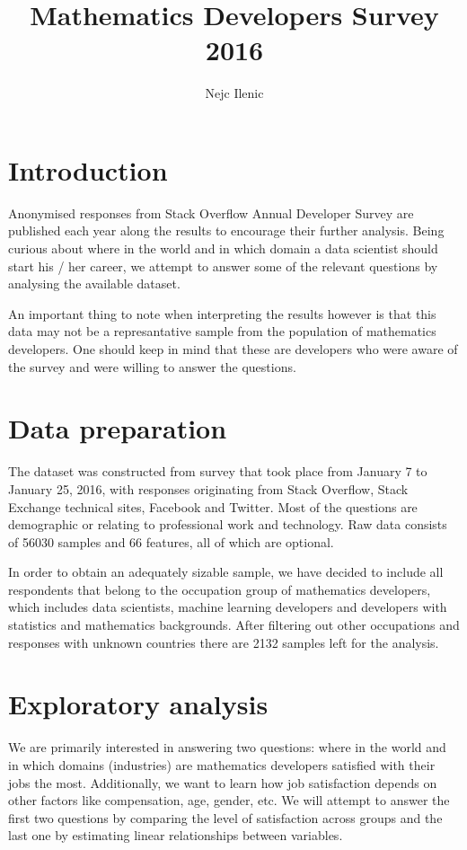 \documentclass{article}
\begin{document}





\title{Mathematics Developers Survey 2016}
\author{Nejc Ilenic}
\date{}
\maketitle

\section{Introduction}
Anonymised responses from Stack Overflow Annual Developer Survey are published each year along the results to encourage their further analysis. Being curious about where in the world and in which domain a data scientist should start his / her career, we attempt to answer some of the relevant questions by analysing the available dataset.

\vspace{2mm}

An important thing to note when interpreting the results however is that this data may not be a represantative sample from the population of mathematics developers. One should keep in mind that these are developers who were aware of the survey and were willing to answer the questions.

\section{Data preparation}
The dataset was constructed from survey that took place from January 7 to January 25, 2016, with responses originating from Stack Overflow, Stack Exchange technical sites, Facebook and Twitter. Most of the questions are demographic or relating to professional work and technology. Raw data consists of 56030 samples and 66 features, all of which are optional.

In order to obtain an adequately sizable sample, we have decided to include all respondents that belong to the occupation group of mathematics developers, which includes data scientists, machine learning developers and developers with statistics and mathematics backgrounds. After filtering out other occupations and responses with unknown countries there are 2132 samples left for the analysis.

\section{Exploratory analysis}
We are primarily interested in answering two questions: where in the world and in which domains (industries) are mathematics developers satisfied with their jobs the most. Additionally, we want to learn how job satisfaction depends on other factors like compensation, age, gender, etc. We will attempt to answer the first two questions by comparing the level of satisfaction across groups and the last one by estimating linear relationships between variables.
\end{document}

